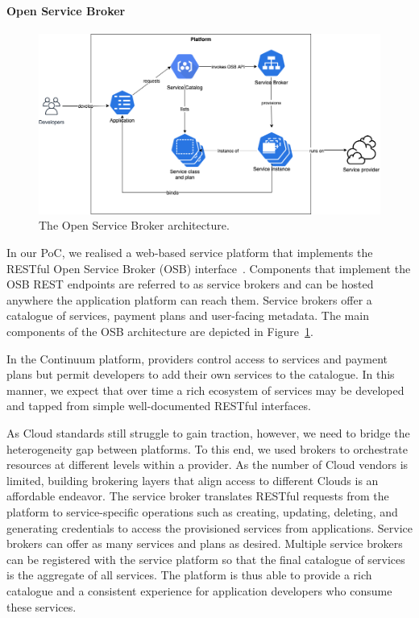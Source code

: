 \paragraph{Open Service Broker}

\begin{figure}[ht]
\centering
\includegraphics[width=\columnwidth]{figures/osb}
\caption{The Open Service Broker architecture.} \label{fig:osb}
\end{figure}

In our PoC, we realised a web-based service platform that implements the RESTful Open Service Broker (OSB) interface~\cite{osb}. Components that implement the OSB REST endpoints are referred to as service brokers and can be hosted anywhere the application platform can reach them. Service brokers offer a catalogue of services, payment plans and user-facing metadata. The main components of the OSB architecture are depicted in Figure~\ref{fig:osb}.

In the Continuum platform, providers control access to services and payment plans but permit developers to add their own services to the catalogue. In this manner, we expect that over time a rich ecosystem of services may be developed and tapped from simple well-documented RESTful interfaces.

As Cloud standards still struggle to gain traction, however, we need to bridge the heterogeneity gap between platforms. 
To this end, we used brokers to orchestrate resources at different levels within a provider. As the number of Cloud vendors is limited, building brokering layers that align access to different Clouds is an affordable endeavor. The service broker translates RESTful requests from the platform to service-specific operations such as creating, updating, deleting, and generating credentials to access the provisioned services from applications. Service brokers can offer as many services and plans as desired. Multiple service brokers can be registered with the service platform so that the final catalogue of services is the aggregate of all services. The platform is thus able to provide a rich catalogue and a consistent experience for application developers who consume these services.

